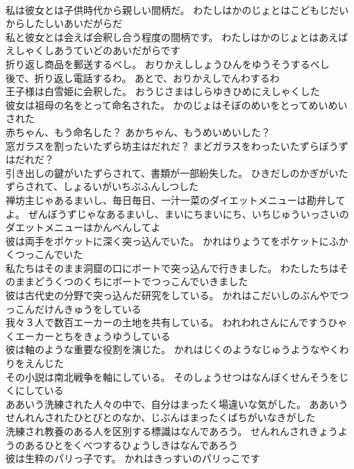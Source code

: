 \documentclass[8pt]{extreport}
\begin{document}
\begin{CJK}{UTF8}{min}
\\	私は彼女とは子供時代から親しい間柄だ。	わたしはかのじょとはこどもじだいからしたしいあいだがらだ 
\\	私と彼女とは会えば会釈し合う程度の間柄です。	わたしはかのじょとはあえばえしゃくしあうていどのあいだがらです 
\\	折り返し商品を郵送するべし。	おりかえししょうひんをゆうそうするべし 
\\	後で、折り返し電話するわ。	あとで、おりかえしでんわするわ 
\\	王子様は白雪姫に会釈した。	おうじさまはしらゆきひめにえしゃくした 
\\	彼女は祖母の名をとって命名された。	かのじょはそぼのめいをとってめいめいされた 
\\	赤ちゃん、もう命名した？	あかちゃん、もうめいめいした？ 
\\	窓ガラスを割ったいたずら坊主はだれだ？	まどガラスをわったいたずらぼうずはだれだ？ 
\\	引き出しの鍵がいたずらされて、書類が一部紛失した。	ひきだしのかぎがいたずらされて、しょるいがいちぶふんしつした 
\\	禅坊主じゃあるまいし、毎日毎日、一汁一菜のダイエットメニューは勘弁してよ。	ぜんぼうずじゃなあるまいし、まいにちまいにち、いちじゅういっさいのダエットメニューはかんべんしてよ 
\\	彼は両手をポケットに深く突っ込んでいた。	かれはりょうてをポケットにふかくつっこんでいた 
\\	私たちはそのまま洞窟の口にボートで突っ込んで行きました。	わたしたちはそのままどうくつのくちにボートでつっこんでいきました 
\\	彼は古代史の分野で突っ込んだ研究をしている。	かれはこだいしのぶんやでつっこんだけんきゅうをしている 
\\	我々３人で数百エーカーの土地を共有している。	われわれさんにんですうひゃくエーカーとちをきょうゆうしている 
\\	彼は軸のような重要な役割を演じた。	かれはじくのようなじゅうようなやくわりをえんじた 
\\	その小説は南北戦争を軸にしている。	そのしょうせつはなんぼくせんそうをじくにしている 
\\	ああいう洗練された人々の中で、自分はまったく場違いな気がした。	ああいうせんれんされたひとびとのなか、じぶんはまったくばちがいなきがした 
\\	洗練され教養のある人を区別する標識はなんであろう。	せんれんされきょうようのあるひとをくべつするひょうしきはなんであろう 
\\	彼は生粋のパリっ子です。	かれはきっすいのパリっこです 

\end{CJK}
\end{document}
